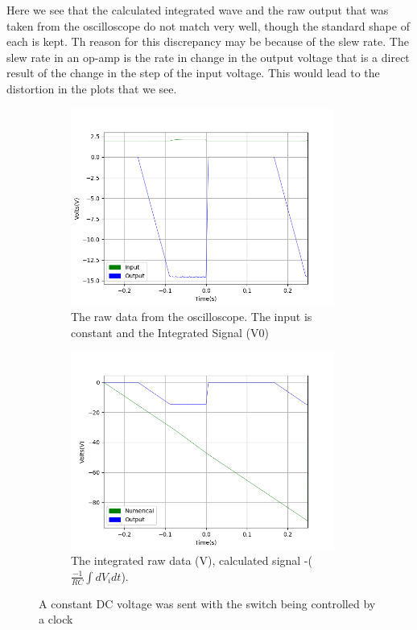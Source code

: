 Here we see that the calculated integrated wave and the raw output that was taken from the oscilloscope do not match very well, though the standard shape of each is kept. Th reason for this discrepancy may be because of the slew rate. The slew rate in an op-amp is the rate in change in the output voltage that is a direct result of the change in the step of the input voltage. This would lead to the distortion in the plots that we see. 

\begin{figure}[h!]
\centering
\begin{subfigure}[t]{.475\textwidth}
  \centering
  \includegraphics[width=0.95\textwidth, height=0.20\textheight]{figures/Intergration/scope_24raw.png}
  \caption{The raw data from the oscilloscope. The input is constant and the Integrated Signal (V0)}
 \label{fig:int_2_og_data}
\end{subfigure}\hfill
\begin{subfigure}[t]{.475\textwidth}
  \centering
  \includegraphics[width=0.95\textwidth, height=0.20\textheight]{figures/Intergration/scope_24.png}
  \caption{The integrated raw data (V), calculated signal -($\frac{-1}{RC}\int dV_i dt$).}
\label{fig:int_2_calc_data}
\end{subfigure}
\caption{A constant DC voltage was sent with the switch being controlled by a clock}
\label{fig:sum_2}
\end{figure}

